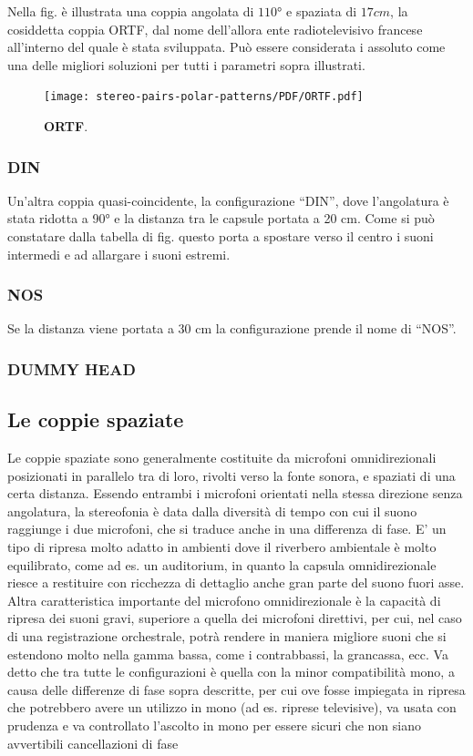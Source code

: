 Nella fig. %
è illustrata una coppia angolata di $110°$ e spaziata
di $17cm$, la cosiddetta coppia ORTF, dal nome dell’allora ente radiotelevisivo
francese all’interno del quale è stata sviluppata. Può essere considerata i
assoluto come una delle migliori soluzioni per tutti i parametri sopra illustrati.
\begin{figure}[h]
\begin{center}
\texttt{[image: stereo-pairs-polar-patterns/PDF/ORTF.pdf]}
\caption{\textbf{ORTF}.}
\label{ORTF}
\end{center}
\end{figure}
\subsubsection*{DIN}
Un’altra coppia quasi-coincidente, la configurazione “DIN”, dove l’angolatura
è stata ridotta a 90° e la distanza tra le capsule portata a 20 cm. Come si può
constatare dalla tabella di fig. %
questo porta a
spostare verso il centro i suoni intermedi e ad allargare i suoni estremi.
\subsubsection*{NOS}
Se la distanza viene portata a 30 cm la configurazione prende il nome di “NOS”.
\subsubsection*{DUMMY HEAD}
\subsection*{Le coppie spaziate}
Le coppie spaziate sono generalmente costituite da microfoni omnidirezionali
posizionati in parallelo tra di loro, rivolti verso la fonte sonora, e spaziati
di una certa distanza. Essendo entrambi i microfoni orientati nella stessa
direzione senza angolatura, la stereofonia è data dalla diversità di tempo
con cui il suono raggiunge i due microfoni, che si traduce anche in una
differenza di fase. E’ un tipo di ripresa molto adatto in ambienti dove il
riverbero ambientale è molto equilibrato, come ad es. un auditorium, in
quanto la capsula omnidirezionale riesce a restituire con ricchezza di dettaglio
anche gran parte del suono fuori asse. Altra caratteristica importante del
microfono omnidirezionale è la capacità di ripresa dei suoni gravi, superiore
a quella dei microfoni direttivi, per cui, nel caso di una registrazione
orchestrale, potrà rendere in maniera migliore suoni che si estendono molto
nella gamma bassa, come i contrabbassi, la grancassa, ecc. Va detto che tra
tutte le configurazioni è quella con la minor compatibilità mono, a causa delle
differenze di fase sopra descritte, per cui ove fosse impiegata in ripresa che
potrebbero avere un utilizzo in mono (ad es. riprese televisive), va usata con
prudenza e va controllato l’ascolto in mono per essere sicuri che non siano
avvertibili cancellazioni di fase


